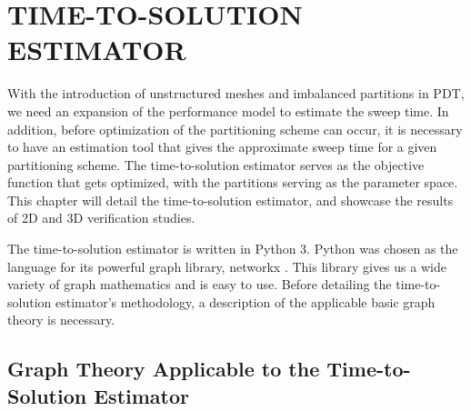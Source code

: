 %
%
%
%
 \setcounter{MaxMatrixCols}{30}
\newcommand{\tcr}[1]{\textcolor{red}{#1}}


\chapter{TIME-TO-SOLUTION ESTIMATOR \label{cha:tts}}
With the introduction of unstructured meshes and imbalanced partitions in PDT, we need an expansion of the performance model to estimate the sweep time.
In addition, before optimization of the partitioning scheme can occur, it is necessary to have an estimation tool that gives the approximate sweep time for a given partitioning scheme.
The time-to-solution estimator serves as the objective function that gets optimized, with the partitions serving as the parameter space. This chapter will detail the time-to-solution estimator, and showcase the results of 2D and 3D verification studies.

The time-to-solution estimator is written in Python 3. Python was chosen as the language for its powerful graph library, networkx \cite{networkx}.
This library gives us a wide variety of graph mathematics and is easy to use.
Before detailing the time-to-solution estimator's methodology, a description of the applicable basic graph theory is necessary.

\section{Graph Theory Applicable to the Time-to-Solution Estimator}

